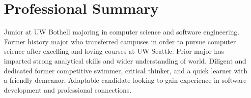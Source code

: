 \documentclass[letterpaper,11pt]{article}
\begin{document}
\section{Professional Summary}
{Junior at UW Bothell majoring in computer science and software engineering. Former
history major who transferred campuses in order to pursue computer science after
excelling and loving courses at UW Seattle. Prior major has imparted strong analytical skills 
and wider understanding of world. Diligent and dedicated former competitive swimmer, 
critical thinker, and a quick learner with a friendly demeanor. Adaptable candidate
looking to gain experience in software development and professional connections.}
\end{document}
